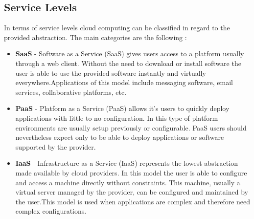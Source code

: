       \subsection{Service Levels} \label{chap:stateoftheheart:sec:cloud:sec:servicelevels}
  		In terms of service levels cloud computing can be classified in regard to the provided abstraction. The main categories are the following \cite{Vaquero2008} :
  		\begin{itemize}
  			\item \textbf{SaaS} - Software as a Service (SaaS) gives users access to a platform usually through a web client. Without the need to  download or install software the user is able to use the provided software instantly and virtually everywhere.\linebreak Applications of this model include messaging software, email services, collaborative platforms, etc.
 				\item \textbf{PaaS} - Platform as a Service (PaaS) allows it's users to quickly deploy applications with little to no configuration. In this type of platform environments are usually setup previously or configurable. PaaS users should nevertheless expect only to be able to deploy applications or software supported by the provider.
  			\item \textbf{IaaS} - Infrastructure as a Service (IaaS) represents the lowest abstraction made available by cloud providers. In this model the user is able to configure and access a machine directly without constraints. This machine, usually a virtual server managed by the provider, can be configured and maintained by the user.\linebreak This model is used when applications are complex and therefore need complex configurations.
  		\end{itemize}

